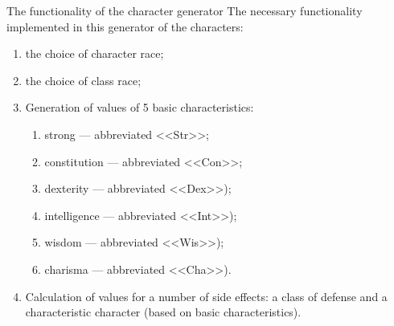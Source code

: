 \documentclass[12pt,a4paper,mathserif]{beamer}
\begin{document}
\begin{frame}{The functionality of the character generator}
    \setlength{\parindent}{0.5cm}
    The necessary functionality implemented in this generator of the characters:

    \begin{enumerate}
        \item the choice of character race;
    
        \item the choice of class race;
    
        \item Generation of values of 5 basic characteristics:
    
        \begin{enumerate}
            \item strong --- abbreviated <<Str>>;
            
            \item constitution --- abbreviated <<Con>>;
            
            \item dexterity --- abbreviated <<Dex>>);
            
            \item intelligence --- abbreviated <<Int>>);
            
            \item wisdom --- abbreviated <<Wis>>);
            
            \item charisma --- abbreviated <<Cha>>).
        \end{enumerate}
    
        \item Calculation of values for a number of side effects: a class of defense and a characteristic character (based on basic characteristics).
    
    
    \end{enumerate}
\end{frame}
\end{document}
